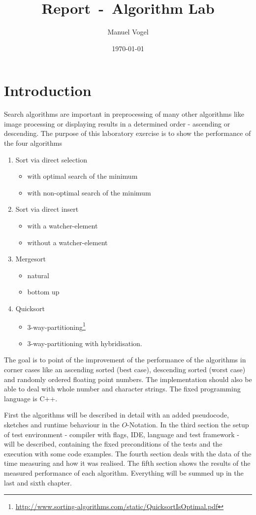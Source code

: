 \documentclass[11pt]{amsart}
\title{Report~-~Algorithm Lab}
\author{Manuel Vogel}
\date{\today} %
\begin{document}
\maketitle
\section{Introduction}
Search algorithms are important in preprocessing of many other algorithms like image processing or displaying results in a determined order - ascending or descending.
The purpose of this laboratory exercise is to show the performance of the four algorithms 
\begin{enumerate}
	\item Sort via direct selection
		\begin{itemize}
			\item with optimal search of the minimum
			\item with non-optimal search of the minimum
		\end{itemize}
	\item Sort via direct insert
		\begin{itemize}
			\item with a watcher-element
			\item without a watcher-element
		\end{itemize}
	\item Mergesort
		\begin{itemize}
			\item natural
			\item bottom up
		\end{itemize}
	\item Quicksort
		\begin{itemize}
			\item 3-way-partitioning\footnote{\url{http://www.sorting-algorithms.com/static/QuicksortIsOptimal.pdf}}
			\item 3-way-partitioning with hybridisation.
		\end{itemize}
\end{enumerate}
The goal is to point of the improvement of the performance of the algorithms in corner cases like an ascending sorted (best case), descending sorted (worst case) and randomly ordered floating point numbers. The implementation should also be able to deal with whole number and character strings. The fixed programming language is C++.

First the algorithms will be described in detail with an added pseudocode, sketches and runtime behaviour in the $O$-Notation. In the third section the setup of test environment - compiler with flags, IDE, language and test framework - will be described, containing the fixed preconditions of the tests and the execution with some code examples. The fourth section deals with the data of the time measuring and how it was realised. The fifth section shows the results of the measured performance of each algorithm. Everything will be summed up in the last and sixth chapter. 
\end{document}
